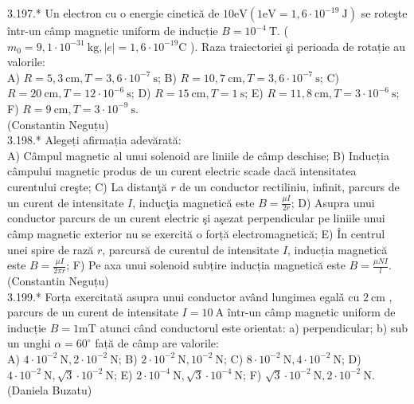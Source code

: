 \documentclass[10pt]{article}
\begin{document}
3.197.* Un electron cu o energie cinetică de $10 \mathrm{eV}\left(1 \mathrm{eV}=1,6 \cdot 10^{-19} \mathrm{~J}\right)$ se roteşte într-un câmp magnetic uniform de inducție $B=10^{-4} \mathrm{~T}$. ( $m_{0}=9,1 \cdot 10^{-31} \mathrm{~kg},|e|=1,6 \cdot 10^{-19} \mathrm{C}$ ). Raza traiectoriei şi perioada de rotație au valorile:\\ A) $R=5,3 \mathrm{~cm}, T=3,6 \cdot 10^{-7} \mathrm{~s}$; B) $R=10,7 \mathrm{~cm}, T=3,6 \cdot 10^{-7} \mathrm{~s}$; C) $R=20 \mathrm{~cm}, T=12 \cdot 10^{-6} \mathrm{~s}$; D) $R=15 \mathrm{~cm}, T=1 \mathrm{~s}$; E) $R=11,8 \mathrm{~cm}, T=3 \cdot 10^{-6} \mathrm{~s}$; F) $R=9 \mathrm{~cm}, T=3 \cdot 10^{-9} \mathrm{~s}$.\\ (Constantin Neguțu)\\

3.198.* Alegeți afirmația adevărată:\\ A) Câmpul magnetic al unui solenoid are liniile de câmp deschise; B) Inducția câmpului magnetic produs de un curent electric scade dacă intensitatea curentului creşte; C) La distanţă $r$ de un conductor rectiliniu, infinit, parcurs de un curent de intensitate $I$, inducţia magnetică este $B=\frac{\mu I}{2 r}$; D) Asupra unui conductor parcurs de un curent electric şi aşezat perpendicular pe liniile unui câmp magnetic exterior nu se exercită o forță electromagnetică; E) În centrul unei spire de rază $r$, parcursă de curentul de intensitate $I$, inducția magnetică este $B=\frac{\mu I}{2 \pi r}$; F) Pe axa unui solenoid subțire inducția magnetică este $B=\frac{\mu N I}{l}$.\\ (Constantin Neguțu)\\

3.199.* Forța exercitată asupra unui conductor având lungimea egalǎ cu $2 \mathrm{~cm}$ , parcurs de un curent de intensitate $I=10 \mathrm{~A}$ într-un câmp magnetic uniform de inducție $B=1 \mathrm{mT}$ atunci când conductorul este orientat: a) perpendicular; b) sub un unghi $\alpha=60^{\circ}$ față de câmp are valorile:\\ A) $4 \cdot 10^{-2} \mathrm{~N}, 2 \cdot 10^{-2} \mathrm{~N}$; B) $2 \cdot 10^{-2} \mathrm{~N}, 10^{-2} \mathrm{~N}$; C) $8 \cdot 10^{-2} \mathrm{~N}, 4 \cdot 10^{-2} \mathrm{~N}$; D) $4 \cdot 10^{-2} \mathrm{~N}, \sqrt{3} \cdot 10^{-2} \mathrm{~N}$; E) $2 \cdot 10^{-4} \mathrm{~N}, \sqrt{3} \cdot 10^{-4} \mathrm{~N}$; F) $\sqrt{3} \cdot 10^{-2} \mathrm{~N}, 2 \cdot 10^{-2} \mathrm{~N}$.\\ (Daniela Buzatu)\\
\end{document}
